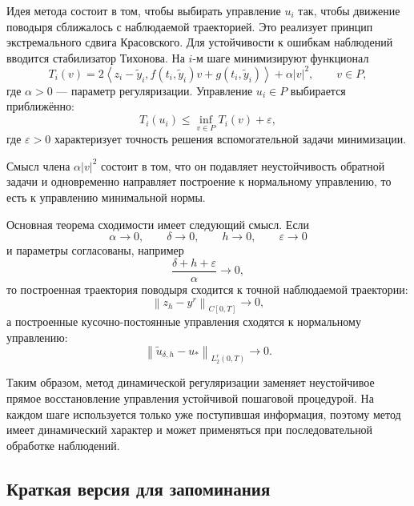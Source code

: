 \documentclass[12pt,a4paper]{article}
\newcommand{\norm}[1]{\left\lVert #1\right\rVert}
\newcommand{\inner}[2]{\left\langle #1,#2\right\rangle}
\begin{document}
Идея метода состоит в том, чтобы выбирать управление $u_i$ так, чтобы движение поводыря сближалось с наблюдаемой траекторией. Это реализует принцип экстремального сдвига Красовского. Для устойчивости к ошибкам наблюдений вводится стабилизатор Тихонова. На $i$-м шаге минимизируют функционал
\begin{equation}
    T_i(v)=
    2\inner{z_i-\tilde y_i}{f(t_i,\tilde y_i)v+g(t_i,\tilde y_i)}
    +\alpha |v|^2,
    \qquad v\in P,
\end{equation}
где $\alpha>0$ --- параметр регуляризации. Управление $u_i\in P$ выбирается приближённо:
\begin{equation}
    T_i(u_i)\le \inf_{v\in P}T_i(v)+\varepsilon,
\end{equation}
где $\varepsilon>0$ характеризует точность решения вспомогательной задачи минимизации.

Смысл члена $\alpha |v|^2$ состоит в том, что он подавляет неустойчивость обратной задачи и одновременно направляет построение к нормальному управлению, то есть к управлению минимальной нормы.

Основная теорема сходимости имеет следующий смысл. Если
\[
    \alpha\to0,
    \qquad \delta\to0,
    \qquad h\to0,
    \qquad \varepsilon\to0
\]
и параметры согласованы, например
\begin{equation}
    \frac{\delta+h+\varepsilon}{\alpha}\to0,
\end{equation}
то построенная траектория поводыря сходится к точной наблюдаемой траектории:
\begin{equation}
    \norm{z_h-y^r}_{C[0,T]}\to0,
\end{equation}
а построенные кусочно-постоянные управления сходятся к нормальному управлению:
\begin{equation}
    \norm{\tilde u_{\delta,h}-u_*}_{L_2^r(0,T)}\to0.
\end{equation}

Таким образом, метод динамической регуляризации заменяет неустойчивое прямое восстановление управления устойчивой пошаговой процедурой. На каждом шаге используется только уже поступившая информация, поэтому метод имеет динамический характер и может применяться при последовательной обработке наблюдений.

\subsection*{Краткая версия для запоминания}
\end{document}

